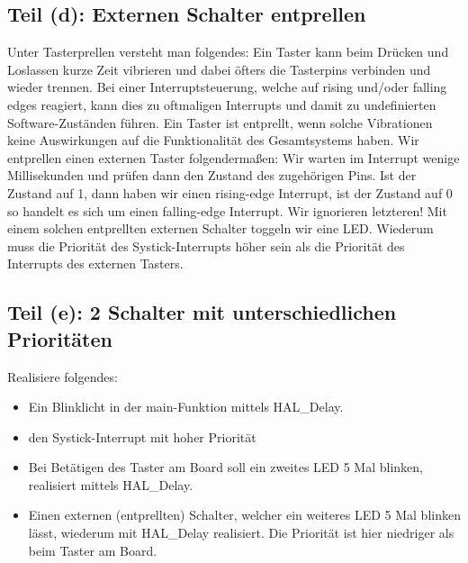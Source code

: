\subsection{Teil (d): Externen Schalter entprellen}
Unter Tasterprellen versteht man folgendes: Ein Taster kann beim Drücken und Loslassen
kurze Zeit vibrieren und dabei öfters die Tasterpins verbinden und wieder trennen. Bei einer
Interruptsteuerung, welche auf rising und/oder falling edges reagiert, kann dies zu
oftmaligen Interrupts und damit zu undefinierten Software-Zuständen führen. Ein Taster ist
entprellt, wenn solche Vibrationen keine Auswirkungen auf die Funktionalität des
Gesamtsystems haben.
Wir entprellen einen externen Taster folgendermaßen: Wir warten im Interrupt wenige
Millisekunden und prüfen dann den Zustand des zugehörigen Pins. Ist der Zustand auf 1,
dann haben wir einen rising-edge Interrupt, ist der Zustand auf 0 so handelt es sich um
einen falling-edge Interrupt. Wir ignorieren letzteren!
Mit einem solchen entprellten externen Schalter toggeln wir eine LED.
Wiederum muss die Priorität des Systick-Interrupts höher sein als die Priorität des Interrupts
des externen Tasters.
\subsection{Teil (e): 2 Schalter mit unterschiedlichen Prioritäten}
Realisiere folgendes:
\begin{itemize}
	\item Ein Blinklicht in der main-Funktion mittels HAL\_Delay.
	\item den Systick-Interrupt mit hoher Priorität
	\item Bei Betätigen des Taster am Board soll ein zweites LED 5 Mal blinken, realisiert
	mittels HAL\_Delay.
	\item Einen externen (entprellten) Schalter, welcher ein weiteres LED 5 Mal blinken lässt,
	wiederum mit HAL\_Delay realisiert. Die Priorität ist hier niedriger als beim Taster am
	Board.
\end{itemize}

